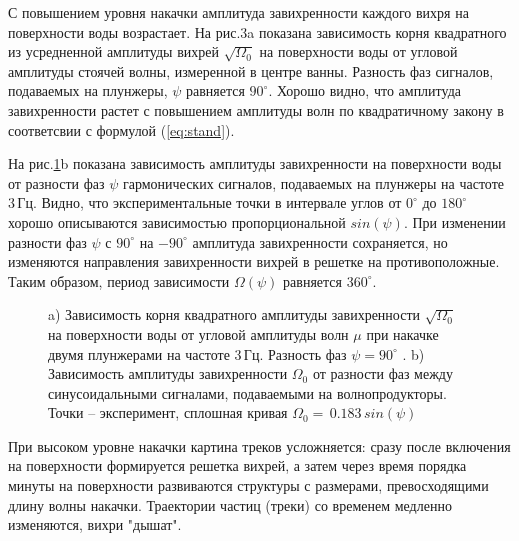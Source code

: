 С повышением уровня накачки амплитуда завихренности каждого вихря на поверхности воды возрастает. На рис.3a показана зависимость корня квадратного из усредненной амплитуды вихрей $\sqrt{\Omega_0}$ на поверхности воды от угловой амплитуды стоячей волны, измеренной в центре ванны. Разность фаз сигналов, подаваемых на плунжеры, $\psi$ равняется $90^\circ$. Хорошо видно, что амплитуда завихренности растет с повышением амплитуды волн по квадратичному закону в соответсвии с формулой (\ref{eq:stand}). 

На рис.\ref{img:ampl_phase}b показана зависимость амплитуды завихренности на поверхности воды от разности фаз $\psi$ гармонических сигналов, подаваемых на плунжеры на частоте 3\,Гц. Видно, что экспериментальные точки в интервале углов от $0^\circ$ до $180^\circ$ хорошо описываются зависимостью пропорциональной $sin(\psi)$. При изменении разности фаз $\psi$ с $90^\circ$ на $-90^\circ$ амплитуда завихренности сохраняется, но изменяются направления завихренности вихрей в решетке на противоположные. Таким образом, период зависимости $\Omega (\psi)$ равняется $360^\circ$. 

\begin{figure}[ht]
  \begin{minipage}[ht]{0.49\linewidth}
  \end{minipage}
  \hfill
  \begin{minipage}[ht]{0.49\linewidth}
  \end{minipage}
  \caption{a) Зависимость корня квадратного амплитуды завихренности $\sqrt{\Omega_0}$ на поверхности воды от угловой амплитуды волн $\mu$ при накачке двумя плунжерами на частоте 3\,Гц. Разность фаз $\psi=90^\circ$ . b) Зависимость амплитуды завихренности $\Omega_0$ от разности фаз между синусоидальными сигналами, подаваемыми на волнопродукторы. Точки – эксперимент, сплошная кривая $\Omega_0 = \,0.183\, sin(\psi)$}
  \label{img:ampl_phase}  
\end{figure}


При высоком уровне накачки картина треков усложняется: сразу после включения на поверхности формируется решетка вихрей, а затем через время порядка минуты на поверхности развиваются структуры с размерами, превосходящими длину волны накачки. Траектории частиц (треки) со временем медленно изменяются, вихри "дышат". 

